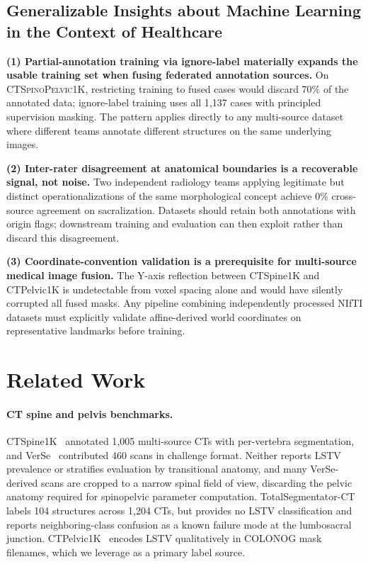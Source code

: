 \documentclass[pmlr]{jmlr}
\newcommand{\dataset}{\textsc{CTSpinoPelvic1K}}
\begin{document}
\subsection*{Generalizable Insights about Machine Learning in the
Context of Healthcare}

\textbf{(1) Partial-annotation training via ignore-label materially
expands the usable training set when fusing federated annotation
sources.} On \dataset{}, restricting training to fused cases would
discard 70\% of the annotated data; ignore-label training uses all
1{,}137 cases with principled supervision masking. The pattern
applies directly to any multi-source dataset where different teams
annotate different structures on the same underlying images.

\textbf{(2) Inter-rater disagreement at anatomical boundaries is a
recoverable signal, not noise.}
Two independent radiology teams applying legitimate but distinct
operationalizations of the same morphological concept achieve 0\%
cross-source agreement on sacralization. Datasets should retain
both annotations with origin flags; downstream training and
evaluation can then exploit rather than discard this disagreement.

\textbf{(3) Coordinate-convention validation is a prerequisite for
multi-source medical image fusion.}
The Y-axis reflection between CTSpine1K and CTPelvic1K is
undetectable from voxel spacing alone and would have silently
corrupted all fused masks. Any pipeline combining independently
processed NIfTI datasets must explicitly validate
affine-derived world coordinates on representative landmarks
before training.

\section{Related Work}
\label{sec:related}

\paragraph{CT spine and pelvis benchmarks.}
CTSpine1K~\citep{Deng2021CTSpine1K:Tomography} annotated 1{,}005 multi-source
CTs with per-vertebra segmentation, and
VerSe~\citep{Sekuboyina2020VerSe:Benchmark} contributed 460 scans in challenge
format.
Neither reports LSTV prevalence or stratifies evaluation by
transitional anatomy, and many VerSe-derived scans are cropped to a
narrow spinal field of view, discarding the pelvic anatomy required
for spinopelvic parameter computation.
TotalSegmentator-CT~\citep{Wasserthal2023TotalSegmentator:Images} labels 104
structures across 1{,}204 CTs, but provides no LSTV classification and
reports neighboring-class confusion as a known failure mode at the
lumbosacral junction.
CTPelvic1K~\citep{Liu2021DeepModels} encodes LSTV qualitatively in
COLONOG mask filenames, which we leverage as a primary label source.
\end{document}
